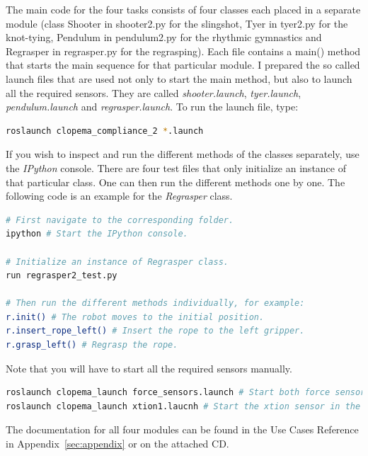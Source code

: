         The main code for the four tasks consists of four classes each placed in a separate module (class Shooter in shooter2.py for the slingshot, Tyer in tyer2.py for the knot-tying, Pendulum in pendulum2.py for the rhythmic gymnastics and Regrasper in regrasper.py for the regrasping). Each file contains a main() method that starts the main sequence for that particular module. I prepared the so called launch files that are used not only to start the main method, but also to launch all the required sensors. They are called \textit{shooter.launch}, \textit{tyer.launch}, \textit{pendulum.launch} and \textit{regrasper.launch}. To run the launch file, type:

                \begin{lstlisting}[language=bash, numbers=none]
roslaunch clopema_compliance_2 *.launch
                \end{lstlisting}

        If you wish to inspect and run the different methods of the classes separately, use the \textit{IPython} console. There are four test files that only initialize an instance of that particular class. One can then run the different methods one by one. The following code is an example for the \textit{Regrasper} class.


                \begin{lstlisting}[language=bash, numbers=none]
# First navigate to the corresponding folder.
ipython # Start the IPython console.

# Initialize an instance of Regrasper class.
run regrasper2_test.py

# Then run the different methods individually, for example:
r.init() # The robot moves to the initial position.
r.insert_rope_left() # Insert the rope to the left gripper.
r.grasp_left() # Regrasp the rope.
                \end{lstlisting}

        Note that you will have to start all the required sensors manually.

              \begin{lstlisting}[language=bash, numbers=none]
roslaunch clopema_launch force_sensors.launch # Start both force sensors.
roslaunch clopema_launch xtion1.laucnh # Start the xtion sensor in the r1 arm.
                \end{lstlisting}

        The documentation for all four modules can be found in the Use Cases Reference in Appendix~\ref{sec:appendix} or on the attached CD.



